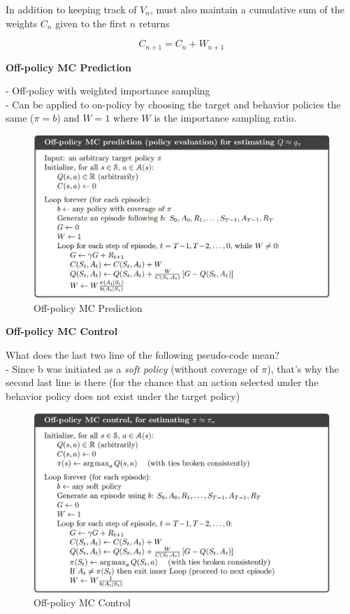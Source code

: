 \documentclass{article}
\begin{document}
\noindent
In addition to keeping track of $V_{n}$, must also maintain a cumulative sum of
the weights $C_{n}$ given to the first $n$ returns

\begin{equation}
C_{n+1}=C_{n}+W_{n+1}
\end{equation}

\newpage
\noindent
\textbf{Off-policy MC Prediction}

\noindent
- Off-policy with weighted importance sampling\\ 
- Can be applied to on-policy by choosing the target and behavior policies the
same ($\pi = b$) and $W = 1$ where $W$ is the importance sampling ratio.

\begin{figure}[h]
\includegraphics[scale=0.25]{offpolicy_mc_prediction}
\centering
\caption{Off-policy MC Prediction}
\end{figure}

\noindent
\textbf{Off-policy MC Control}

\noindent
What does the last two line of the following pseudo-code mean?\\
- Since b was initiated as a \textit{soft policy} (without coverage of $\pi$),
that's why the second last line is there (for the chance that an action selected
under the behavior policy does not exist under the target policy)\\

\begin{figure}[h]
\includegraphics[scale=0.25]{offpolicy_mc_control}
\centering
\caption{Off-policy MC Control}
\end{figure}
\end{document}
